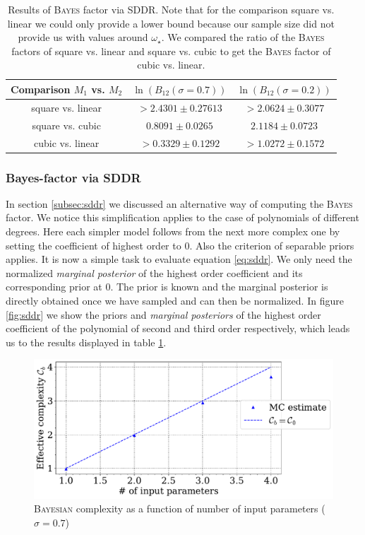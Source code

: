 \documentclass[%
 reprint,
 amsmath,amssymb,
 aps,
]{revtex4-1}
\begin{document}
\begin{table}[H]
		{\renewcommand{\arraystretch}{1.3}
			\begin{tabular}{|c|c|c|}
				\hline
				Comparison $M_1$ vs. $M_2$ & $\ln(B_{12}(\sigma=0.7))$ & $\ln(B_{12}(\sigma=0.2))$ \\
				\hline
				square vs. linear& $>2.4301\pm0.27613$&$>2.0624\pm0.3077$\\
				square vs. cubic&$0.8091\pm0.0265$  &$2.1184\pm0.0723$\\
				cubic vs. linear & $>0.3329\pm0.1292$&$>1.0272\pm0.1572$\\
				\hline
	\end{tabular}}
	\caption{Results of \textsc{Bayes} factor via SDDR. Note that for the comparison square vs. linear we could only provide a lower bound because our sample size did not provide us with values around $\omega_\star$. We compared the ratio of the \textsc{Bayes} factors of square vs. linear and square vs. cubic to get the \textsc{Bayes} factor of cubic vs. linear.}
	\label{tab:res_sddr}
\end{table}
\subsubsection{\textbf{Bayes-factor via SDDR}}
\noindent In section \eqref{subsec:sddr} we discussed an alternative way of computing the \textsc{Bayes} factor. We notice this simplification applies to the case of polynomials of different degrees. Here each simpler model follows from the next more complex one by setting the coefficient of highest order to $0$. Also the criterion of separable priors applies. It is now a simple task to evaluate equation \eqref{eq:sddr}. We only need the normalized \emph{marginal posterior} of the highest order coefficient and its corresponding prior at $0$. The prior is known and the marginal posterior is directly obtained once we have sampled and can then be normalized. In figure \ref{fig:sddr} we show the priors and \emph{marginal posteriors} of the highest order coefficient of the polynomial of second and third order respectively, which leads us to the results displayed in table \ref{tab:res_sddr}.

\begin{figure}[H]
	\centering
	\includegraphics[width=\linewidth]{_sigma_07acomplexity.pdf}
	\caption{\textsc{Bayesian} complexity as a function of number of input parameters ($\sigma=0.7$)}
	\label{fig:complex}
\end{figure}
\end{document}
